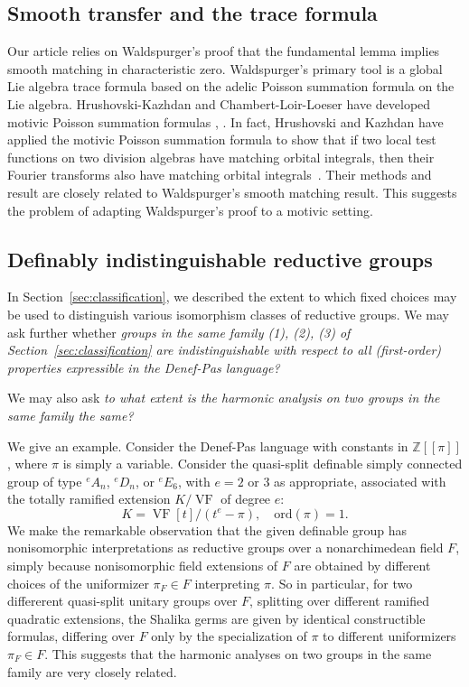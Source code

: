 \documentclass[12pt]{amsart}
\newcommand{\op}[1]{\operatorname{#1}}
\newcommand{\ring}[1]{{\mathbb #1}}
\def\VF{{\op{VF}}}
\newcommand\ord{\mathrm{ord}}
\theoremstyle{plain}
\theoremstyle{definition}
\begin{document}
\subsection{Smooth transfer and the trace formula}

Our article relies on Waldspurger's proof that the fundamental lemma
implies smooth matching in characteristic zero.  Waldspurger's primary
tool is a global Lie algebra trace formula based on the adelic Poisson
summation formula on the Lie algebra.  Hrushovski-Kazhdan and
Chambert-Loir-Loeser have developed motivic Poisson summation
formulas \cite{hrushovski2009motivic}, \cite{chambert2013motivic}.  In
fact, Hrushovski and Kazhdan have applied the motivic Poisson
summation formula to show that if two local test functions on two division
algebras have matching orbital integrals, then their Fourier
transforms also have matching orbital integrals~\cite[Theorem
1.1]{hrushovski2009motivic}.  Their methods and result are closely
related to Waldspurger's smooth matching result.  This suggests the
problem of adapting Waldspurger's proof to a motivic setting.

\subsection{Definably indistinguishable reductive groups}

In Section~\ref{sec:classification}, we described the extent to which
fixed choices may be used to distinguish various isomorphism classes
of reductive groups.  We may ask further whether {\it groups in the
  same family (1), (2), (3) of Section~\ref{sec:classification} are
  indistinguishable with respect to all (first-order) properties
  expressible in the Denef-Pas language?}

We may also ask {\it to what extent is the harmonic analysis on two groups
in the same family the same?}

We give an example.  Consider the Denef-Pas language with constants in
$\ring{Z}[[\pi]]$, where $\pi$ is simply a variable.  Consider the
quasi-split definable simply connected group of type ${}^eA_n$,
${}^eD_n$, or ${}^eE_6$, with $e=2$ or $3$ as appropriate, associated
with the totally ramified extension $K/\VF$ of degree $e$:
\[
K = \VF[t]/(t^e - \pi),\quad \ord (\pi) = 1.
\]
We make the remarkable observation that the given definable group has
nonisomorphic interpretations as reductive groups over a
nonarchimedean field $F$, simply because nonisomorphic field
extensions of $F$ are obtained by different choices of the uniformizer
$\pi_F\in F$ interpreting $\pi$.  So in particular, for two differerent
quasi-split unitary groups over $F$, splitting over different ramified
quadratic extensions, the Shalika germs are given by identical
constructible formulas, differing over $F$ only by the specialization
of $\pi$ to different uniformizers $\pi_F\in F$.  This suggests that
the harmonic analyses on two groups in the same family are very closely
related.
\end{document}
